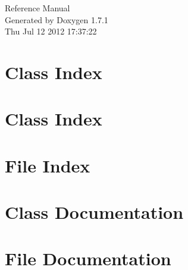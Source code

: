 \documentclass[a4paper]{book}
\begin{document}
\hypersetup{pageanchor=false}
\begin{titlepage}
\vspace*{7cm}
\begin{center}
{\Large Reference Manual}\\
\vspace*{1cm}
{\large Generated by Doxygen 1.7.1}\\
\vspace*{0.5cm}
{\small Thu Jul 12 2012 17:37:22}\\
\end{center}
\end{titlepage}
\clearemptydoublepage
{}
\tableofcontents
\clearemptydoublepage
{}
\hypersetup{pageanchor=true}
\chapter{Class Index}

\chapter{Class Index}

\chapter{File Index}

\chapter{Class Documentation}













\chapter{File Documentation}





\printindex
\end{document}
